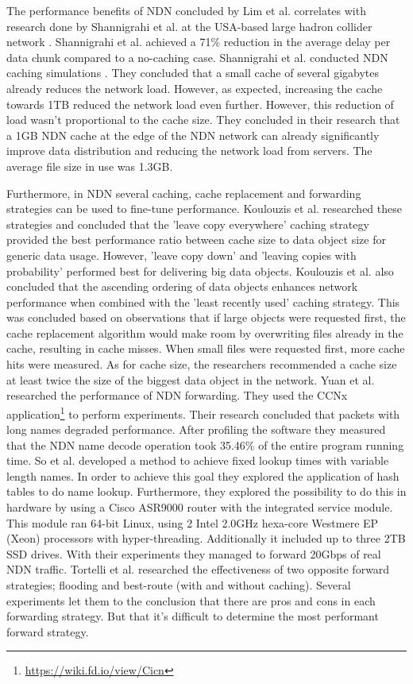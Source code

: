 The performance benefits of NDN concluded by Lim et al. correlates with research done by Shannigrahi et al. at the USA-based large hadron collider network \cite{shannigrahi2015named}. Shannigrahi et al. achieved a 71\% reduction in the average delay per data chunk compared to a no-caching case. Shannigrahi et al. conducted NDN caching simulations \cite{shannigrahi2017request}. They concluded that a small cache of several gigabytes already reduces the network load. However, as expected, increasing the cache towards 1TB reduced the network load even further. However, this reduction of load wasn't proportional to the cache size. They concluded in their research that a 1GB NDN cache at the edge of the NDN network can already significantly improve data distribution and reducing the network load from servers. The average file size in use was 1.3GB.

Furthermore, in NDN several caching, cache replacement and forwarding strategies can be used to fine-tune performance. Koulouzis et al. researched these strategies and concluded that the 'leave copy everywhere' caching strategy provided the best performance ratio between cache size to data object size for generic data usage. However, 'leave copy down' and 'leaving copies with probability' performed best for delivering big data objects. Koulouzis et al. also concluded that the ascending ordering of data objects enhances network performance when combined with the 'least recently used' caching strategy. This was concluded based on observations that if large objects were requested first, the cache replacement algorithm would make room by overwriting files already in the cache, resulting in cache misses. When small files were requested first, more cache hits were measured. As for cache size, the researchers recommended a cache size at least twice the size of the biggest data object in the network. Yuan et al. \cite{yuan2012scalable} researched the performance of NDN forwarding. They used the CCNx application\footnote{\url{https://wiki.fd.io/view/Cicn}} to perform experiments. Their research concluded that packets with long names degraded performance. After profiling the software they measured that the NDN name decode operation took 35.46\% of the entire program running time. So et al. \cite{so2013named} developed a method to achieve fixed lookup times with variable length names. In order to achieve this goal they explored the application of hash tables to do name lookup. Furthermore, they explored the possibility to do this in hardware by using a Cisco ASR9000 router with the integrated service module. This module ran 64-bit Linux, using 2 Intel 2.0GHz hexa-core Westmere EP (Xeon) processors with hyper-threading. Additionally it included up to three 2TB SSD drives. With their experiments they managed to forward 20Gbps of real NDN traffic. Tortelli et al. \cite{tortelli2013performance} researched the effectiveness of two opposite forward strategies; flooding and best-route (with and without caching). Several experiments let them to the conclusion that there are pros and cons in each forwarding strategy. But that it's difficult to determine the most performant forward strategy.

